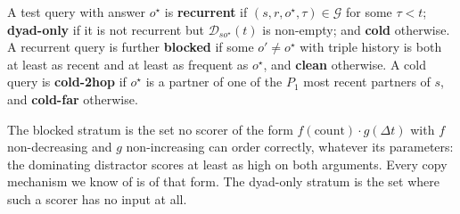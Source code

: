 \begin{definition}[Strata]
\label{def:strata}
A test query with answer $o^\star$ is \textbf{recurrent} if $(s, r, o^\star, \tau) \in \mathcal{G}$ for some $\tau < t$; \textbf{dyad-only} if it is not recurrent but $\mathcal{D}_{so^\star}(t)$ is non-empty; and \textbf{cold} otherwise. A recurrent query is further \textbf{blocked} if some $o' \neq o^\star$ with triple history is both at least as recent and at least as frequent as $o^\star$, and \textbf{clean} otherwise. A cold query is \textbf{cold-2hop} if $o^\star$ is a partner of one of the $P_1$ most recent partners of $s$, and \textbf{cold-far} otherwise.
\end{definition}

The blocked stratum is the set no scorer of the form $f(\text{count}) \cdot g(\Delta t)$ with $f$ non-decreasing and $g$ non-increasing can order correctly, whatever its parameters: the dominating distractor scores at least as high on both arguments. Every copy mechanism we know of is of that form. The dyad-only stratum is the set where such a scorer has no input at all.
